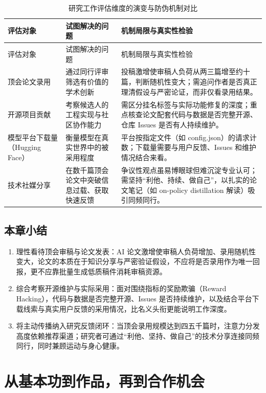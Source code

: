 \documentclass[UTF8,a4paper,11pt,fontset=fandol]{ctexart}
\begin{document}
\begingroup\small\setlength{\LTcapwidth}{\linewidth}
\begin{longtable}{>{\raggedright\arraybackslash}p{\dimexpr(\linewidth-6\tabcolsep)/3\relax}>{\raggedright\arraybackslash}p{\dimexpr(\linewidth-6\tabcolsep)/3\relax}>{\raggedright\arraybackslash}p{\dimexpr(\linewidth-6\tabcolsep)/3\relax}}
\caption{研究工作评估维度的演变与防伪机制对比}\\
\toprule
评估对象 & 试图解决的问题 & 机制局限与真实性检验\\\midrule
\endfirsthead
\toprule
评估对象 & 试图解决的问题 & 机制局限与真实性检验\\\midrule
\endhead
顶会论文录用 & 通过同行评审筛选有价值的学术创新 & 投稿激增使审稿人负荷从两三篇增至约十篇，判断随机性变大；需追问作者是否真正理清假设与严密论证，而非仅看录用结果。\\[4pt]
开源项目贡献 & 考察候选人的工程实现与社区协作能力 & 需区分挂名标签与实际功能修复的深度；重点核查论文配套代码与数据是否完整开源、仓库 Issues 是否有人持续维护。\\[4pt]
模型平台下载量（Hugging Face） & 衡量模型在真实世界中的被采用程度 & 平台按指定文件（如 config.json）的请求计数；下载量需要与用户反馈、Issues 和维护情况结合来看。\\[4pt]
技术社媒分享 & 在数千篇顶会论文中突破信息过载、获取快速反馈 & 争议性观点虽易博眼球但难沉淀专业认可；需坚持“利他、持续、做自己”，以扎实的论文笔记（如 on-policy distillation 解读）吸引同频同行。\\[4pt]
\bottomrule\end{longtable}\endgroup
{}\subsection{本章小结}
\begin{enumerate}
\item 理性看待顶会审稿与论文发表：AI 论文激增使审稿人负荷增加、录用随机性变大，论文的本质在于知识分享与严密验证假设，不应将是否录用作为唯一回报，更不应靠批量生成低质稿件消耗审稿资源。
\item 综合考察开源维护与实际采用：面对围绕指标的奖励欺骗（Reward Hacking），代码与数据是否完整开源、Issues 是否持续维护，以及结合平台下载线索与真实用户反馈的采用情况，比名义头衔更能说明工作深度。
\item 将主动传播纳入研究反馈闭环：当顶会录用规模达到四五千篇时，注意力分发高度依赖推荐渠道；研究者可通过“利他、坚持、做自己”的技术分享连接同频同行，同时兼顾运动与身心健康。
\end{enumerate}
\section{从基本功到作品，再到合作机会}
\end{document}
